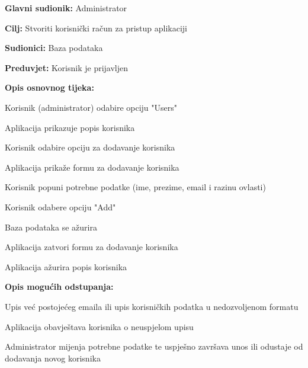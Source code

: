 					\noindent {}
					\begin{packed_item}

						\item \textbf{Glavni sudionik:} Administrator
						\item \textbf{Cilj:} Stvoriti korisnički račun za pristup aplikaciji
						\item \textbf{Sudionici:} Baza podataka
						\item \textbf{Preduvjet:} Korisnik je prijavljen
						\item \textbf{Opis osnovnog tijeka:}

						\item[] \begin{packed_enum}

							\item Korisnik (administrator) odabire opciju "Users"
							\item Aplikacija prikazuje popis korisnika
							\item Korisnik odabire opciju za dodavanje korisnika
							\item Aplikacija prikaže formu za dodavanje korisnika
							\item Korisnik popuni potrebne podatke (ime, prezime, email i razinu ovlasti)
							\item Korisnik odabere opciju "Add"
							\item Baza podataka se ažurira
							\item Aplikacija zatvori formu za dodavanje korisnika
							\item Aplikacija ažurira popis korisnika
						\end{packed_enum}

						\item \textbf{Opis mogućih odstupanja:}

						\item[] \begin{packed_item}

							\item[3.a] Upis već postojećeg emaila ili upis korisničkih
							podatka u nedozvoljenom formatu
							\item[] \begin{packed_enum}

								\item Aplikacija obavještava korisnika o neuspjelom upisu
								\item Administrator mijenja potrebne podatke te uspješno završava unos ili
								odustaje od dodavanja novog korisnika

							\end{packed_enum}

						\end{packed_item}
					\end{packed_item}


